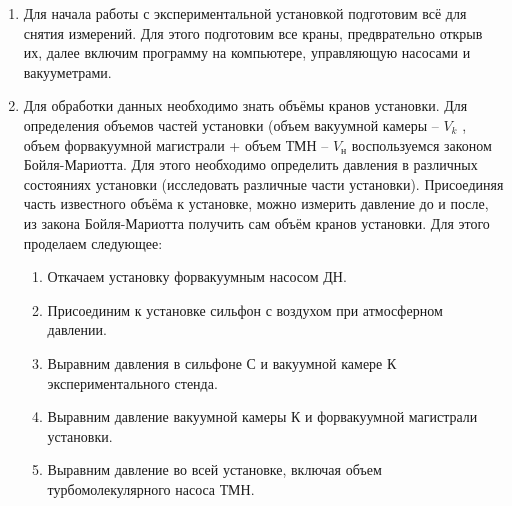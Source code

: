 \documentclass[12pt,a4paper]{article}
\begin{document}
\begin{enumerate}
	\item Для начала работы с экспериментальной установкой подготовим всё для снятия измерений. Для этого подготовим все краны, предврательно открыв их, далее включим программу на компьютере, управляющую насосами и вакууметрами.
	\item Для обработки данных необходимо знать объёмы кранов установки. Для определения объемов частей установки (объем вакуумной камеры – $V_k$ , объем форвакуумной магистрали + объем ТМН – $V_н$ воспользуемся законом Бойля-Мариотта. Для этого необходимо определить давления в различных состояниях установки (исследовать различные части установки).
	Присоединяя часть известного объёма к установке, можно измерить давление до и после, из закона Бойля-Мариотта получить сам объём кранов установки.
	Для этого проделаем следующее:
	\begin{enumerate}
		\item Откачаем установку форвакуумным насосом ДН.
		
		\item Присоединим к установке сильфон с воздухом при атмосферном давлении.
		
		\item Выравним давления в сильфоне С и вакуумной камере К экспериментального стенда.
		
		\item Выравним давление вакуумной камеры К и форвакуумной магистрали установки.
		
		\item Выравним давление во всей установке, включая объем турбомолекулярного насоса ТМН.
		

\end{enumerate}
\end{enumerate}
\end{document}
